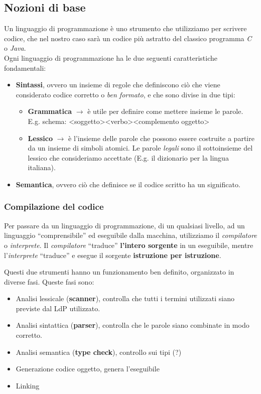 \documentclass{article}
\begin{document}
\subsection{Nozioni di base}
Un linguaggio di programmazione è uno strumento che utilizziamo per scrivere codice, che nel nostro caso sarà un codice più astratto del classico programma \emph{C} o \emph{Java}.\\
Ogni linguaggio di programmazione ha le due seguenti caratteristiche fondamentali:
\begin{itemize}
    \item \textbf{Sintassi}, ovvero un insieme di regole che definiscono ciò che viene considerato codice corretto o \emph{ben formato}, e che sono divise in due tipi:
          \begin{itemize}
              \item \textbf{Grammatica} \(\rightarrow\) è utile per definire come mettere insieme le parole.\\
                    E.g. schema: \textless soggetto\textgreater\textless verbo\textgreater\textless complemento oggetto\textgreater
              \item \textbf{Lessico} \(\rightarrow\) è l'insieme delle parole che possono essere costruite a partire da un insieme di simboli atomici. Le parole \emph{legali} sono il sottoinsieme del lessico che consideriamo accettate (E.g. il dizionario per la lingua italiana).
          \end{itemize}
    \item \textbf{Semantica}, ovvero ciò che definisce se il codice scritto ha un significato.
\end{itemize}

\subsubsection{Compilazione del codice}
Per passare da un linguaggio di programmazione, di un qualsiasi livello, ad un linguaggio ``comprensibile'' ed eseguibile dalla macchina, utilizziamo il \emph{compilatore} o \emph{interprete}. Il \emph{compilatore} ``traduce'' \textbf{l'intero sorgente} in un eseguibile, mentre l'\emph{interprete} ``traduce'' e esegue il sorgente \textbf{istruzione per istruzione}.

Questi due strumenti hanno un funzionamento ben definito, organizzato in diverse fasi. Queste fasi sono:
\begin{itemize}
    \item Analisi lessicale (\textbf{scanner}), controlla che tutti i termini utilizzati siano previste dal LdP utilizzato.
    \item Analisi sintattica (\textbf{parser}), controlla che le parole siano combinate in modo corretto.
    \item Analisi semantica (\textbf{type check}), controllo sui tipi (?)
    \item Generazione codice oggetto, genera l'eseguibile
    \item Linking
\end{itemize}
\end{document}
